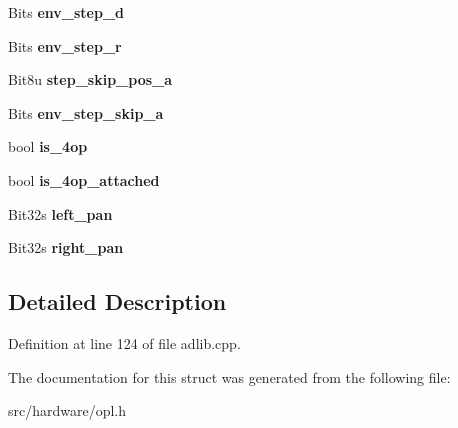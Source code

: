 \begin{DoxyCompactItemize}
\item 
\hypertarget{structOPL3_1_1operator__struct_a9050a9e15f23f346b9abaa247142e748}{Bits {\bfseries env\-\_\-step\-\_\-d}}\label{structOPL3_1_1operator__struct_a9050a9e15f23f346b9abaa247142e748}

\item 
\hypertarget{structOPL3_1_1operator__struct_a585aed25438db91f5896c576607b4418}{Bits {\bfseries env\-\_\-step\-\_\-r}}\label{structOPL3_1_1operator__struct_a585aed25438db91f5896c576607b4418}

\item 
\hypertarget{structOPL3_1_1operator__struct_a49df735521f89c182d93d48ba7c244ba}{Bit8u {\bfseries step\-\_\-skip\-\_\-pos\-\_\-a}}\label{structOPL3_1_1operator__struct_a49df735521f89c182d93d48ba7c244ba}

\item 
\hypertarget{structOPL3_1_1operator__struct_a8a73550dedecbf91e2ec0408c5692046}{Bits {\bfseries env\-\_\-step\-\_\-skip\-\_\-a}}\label{structOPL3_1_1operator__struct_a8a73550dedecbf91e2ec0408c5692046}

\item 
\hypertarget{structOPL3_1_1operator__struct_a573b44bf581bc7b3935c5ae8b11c53d3}{bool {\bfseries is\-\_\-4op}}\label{structOPL3_1_1operator__struct_a573b44bf581bc7b3935c5ae8b11c53d3}

\item 
\hypertarget{structOPL3_1_1operator__struct_a7f5b5ee4f517a1beeeda95132e0d8d53}{bool {\bfseries is\-\_\-4op\-\_\-attached}}\label{structOPL3_1_1operator__struct_a7f5b5ee4f517a1beeeda95132e0d8d53}

\item 
\hypertarget{structOPL3_1_1operator__struct_a7472c8e4e2387cd3913216e31572101d}{Bit32s {\bfseries left\-\_\-pan}}\label{structOPL3_1_1operator__struct_a7472c8e4e2387cd3913216e31572101d}

\item 
\hypertarget{structOPL3_1_1operator__struct_a9e6dbb028fc9dfe3a6be2d0b2ec27fb4}{Bit32s {\bfseries right\-\_\-pan}}\label{structOPL3_1_1operator__struct_a9e6dbb028fc9dfe3a6be2d0b2ec27fb4}

\end{DoxyCompactItemize}


\subsection{Detailed Description}


Definition at line 124 of file adlib.\-cpp.



The documentation for this struct was generated from the following file\-:\begin{DoxyCompactItemize}
\item 
src/hardware/opl.\-h\end{DoxyCompactItemize}
